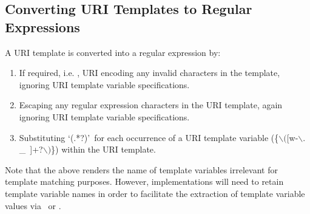 \subsection{Converting URI Templates to Regular Expressions}
\label{template_to_regex}

A URI template is converted into a regular expression by:
\begin{enumerate}
\item If required, i.e. \UriTemplate{}, URI encoding any invalid characters in the template, ignoring URI template variable specifications.
\item Escaping any regular expression characters in the URI template, again ignoring URI template variable specifications.
\item Substituting \lq(.*?)\rq\ for each occurrence of a URI template variable (\{$\backslash($[w-$\backslash.$\_~]+?$\backslash)$\}) within the URI template.
\end{enumerate}

Note that the above renders the name of template variables irrelevant for template matching purposes. However, implementations will need to retain template variable names in order to facilitate the extraction of template variable values via \UriParam\ or \UriInfo{}.
